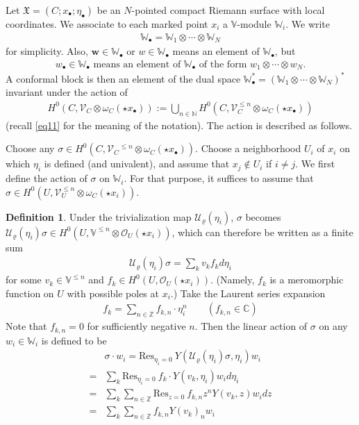 \documentclass[11pt,b5paper,notitlepage]{article}
\theoremstyle{definition}
\newtheorem{df}{Definition}[section]
\theoremstyle{plain}
\newcommand{\fk}{\mathfrak}
\newcommand{\mc}{\mathcal}
\newcommand{\Res}{\mathrm{Res}}
\newcommand{\scr}{\mathscr}
\newcommand{\mbf}{\mathbf}
\newcommand{\blt}{\bullet}
\newcommand{\Vbb}{\mathbb V}
\newcommand{\Wbb}{\mathbb W}
\newcommand{\Cbb}{\mathbb C}
\newcommand{\Nbb}{\mathbb N}
\newcommand{\Zbb}{\mathbb Z}
\numberwithin{equation}{section}
\begin{document}
Let $\fk X=(C;x_\blt;\eta_\blt)$ be an $N$-pointed compact Riemann surface with local coordinates. We associate to each marked point $x_i$ a $\Vbb$-module $\Wbb_i$. We write
\begin{align*}
\Wbb_\blt=\Wbb_1\otimes\cdots\otimes \Wbb_N
\end{align*}
for simplicity. Also, $\mbf w\in\Wbb_\blt$ or $w\in\Wbb_\blt$ means an element of $\Wbb_\blt$, but \index{W@$\Wbb_\blt=\Wbb_1\otimes\cdots\otimes\Wbb_N,w_\blt=w_1\otimes\cdots\otimes w_N$}
\begin{align*}
w_\blt\in\Wbb_\blt\text{ means an element of $\Wbb_\blt$ of the form }w_1\otimes\cdots\otimes w_N.
\end{align*}
A conformal block is then an element of the dual space $\Wbb_\blt^*=(\Wbb_1\otimes\cdots\otimes\Wbb_N)^*$ invariant under the action of
\begin{align*}
H^0(C,\scr V_C\otimes\omega_C(\star x_\blt)):=\bigcup_{n\in\Nbb} H^0(C,\scr V_C^{\leq n}\otimes\omega_C(\star x_\blt))
\end{align*}
(recall \eqref{eq11} for the meaning of the notation). The action is described as follows.

Choose any $\sigma\in H^0(C,\scr V_C{^{\leq n}}\otimes\omega_C(\star x_\blt))$. Choose a neighborhood $U_i$ of $x_i$ on which $\eta_i$ is defined (and univalent), and assume that $x_j\notin U_i$ if $i\neq j$. We first define the action of $\sigma$ on $\Wbb_i$. For that purpose, it suffices to assume that $\sigma\in H^0(U,\scr V_U^{\leq n}\otimes\omega_C(\star x_i))$.
\begin{df}
Under the trivialization map $\mc U_\varrho(\eta_i)$, $\sigma$ becomes $\mc U_\varrho(\eta_i)\sigma\in H^0(U,\Vbb^{\leq n}\otimes\scr O_U(\star x_i))$, which can therefore be written as a finite sum
\begin{align*}
\mc U_\varrho(\eta_i)\sigma=\sum_k v_kf_kd\eta_i
\end{align*}
for some $v_k\in\Vbb^{\leq n}$ and $f_k\in H^0(U,\scr O_U(\star x_i))$. (Namely, $f_k$ is a meromorphic function on $U$ with possible poles at $x_i$.) Take the Laurent series expansion
\begin{align*}
f_k=\sum_{n\in\Zbb} f_{k,n}\cdot \eta_i^n\qquad(f_{k,n}\in\Cbb)
\end{align*}
Note that $f_{k,n}=0$ for sufficiently negative $n$. Then the linear action of $\sigma$ on any $w_i\in\Wbb_i$ is defined to be
\begin{align}
&\sigma\cdot w_i=\Res_{\eta_i=0}~Y(\mc U_\varrho(\eta_i)\sigma,\eta_i)w_i  \nonumber\\
=&\sum_k \Res_{\eta_i=0}~f_k\cdot Y(v_k,\eta_i)w_id\eta_i  \nonumber\\
=&\sum_k\sum_{n\in\Zbb} \Res_{z=0}~f_{k,n}z^nY(v_k,z)w_idz  \nonumber\\
=&\sum_k\sum_{n\in\Zbb} f_{k,n}Y(v_k)_nw_i   \label{eq5}
\end{align}
\end{df}
\end{document}
